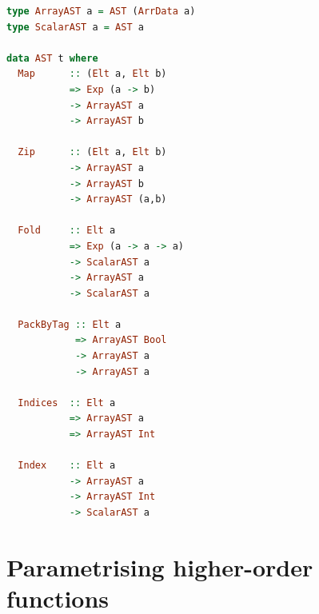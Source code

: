 \documentclass[preamble.tex]{subfiles}
\begin{document}
\begin{lstlisting}[basicstyle={\ttfamily},language=Haskell]
type ArrayAST a = AST (ArrData a)
type ScalarAST a = AST a

data AST t where
  Map      :: (Elt a, Elt b)
           => Exp (a -> b)
           -> ArrayAST a
           -> ArrayAST b

  Zip      :: (Elt a, Elt b)
           -> ArrayAST a
           -> ArrayAST b
           -> ArrayAST (a,b)

  Fold     :: Elt a
           => Exp (a -> a -> a)
           -> ScalarAST a
           -> ArrayAST a
           -> ScalarAST a

  PackByTag :: Elt a
            => ArrayAST Bool
            -> ArrayAST a
            -> ArrayAST a

  Indices  :: Elt a
           => ArrayAST a
           => ArrayAST Int

  Index    :: Elt a
           -> ArrayAST a
           -> ArrayAST Int
           -> ScalarAST a
\end{lstlisting}



\section{Parametrising higher-order functions}
\end{document}
